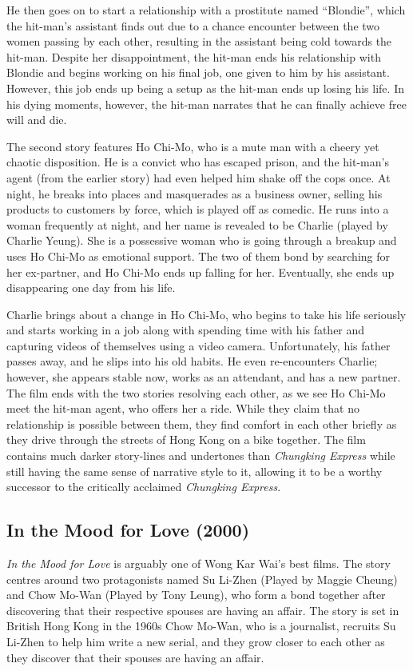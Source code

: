 \begin{multicols}{2}
He then goes on to start a relationship with a prostitute named “Blondie”, which the hit-man’s assistant finds out due to a chance encounter between the two women passing by each other, resulting in the assistant being cold towards the hit-man. Despite her disappointment, the hit-man ends his relationship with Blondie and begins working on his final job, one given to him by his assistant. However, this job ends up being a setup as the hit-man ends up losing his life. In his dying moments, however, the hit-man narrates that he can finally achieve free will and die.

The second story features Ho Chi-Mo, who is a mute man with a cheery yet chaotic disposition. He is a convict who has escaped prison, and the hit-man’s agent (from the earlier story) had even helped him shake off the cops once. At night, he breaks into places and masquerades as a business owner, selling his products to customers by force, which is played off as comedic. He runs into a woman frequently at night, and her name is revealed to be Charlie (played by Charlie Yeung). She is a possessive woman who is going through a breakup and uses Ho Chi-Mo as emotional support. The two of them bond by searching for her ex-partner, and Ho Chi-Mo ends up falling for her. Eventually, she ends up disappearing one day from his life. 

Charlie brings about a change in Ho Chi-Mo, who begins to take his life seriously and starts working in a job along with spending time with his father and capturing videos of themselves using a video camera. Unfortunately, his father passes away, and he slips into his old habits. He even re-encounters Charlie; however, she appears stable now, works as an attendant, and has a new partner. The film ends with the two stories resolving each other, as we see Ho Chi-Mo meet the hit-man agent, who offers her a ride. While they claim that no relationship is possible between them, they find comfort in each other briefly as they drive through the streets of Hong Kong on a bike together. The film contains much darker story-lines and undertones than \emph{Chungking Express} while still having the same sense of narrative style to it, allowing it to be a worthy successor to the critically acclaimed \emph{Chungking Express}.

\subsection{In the Mood for Love (2000)}
\emph{In the Mood for Love} is arguably one of Wong Kar Wai’s best films. The story centres around two protagonists named Su Li-Zhen (Played by Maggie Cheung) and Chow Mo-Wan (Played by Tony Leung), who form a bond together after discovering that their respective spouses are having an affair. The story is set in British Hong Kong in the 1960s Chow Mo-Wan, who is a journalist, recruits Su Li-Zhen to help him write a new serial, and they grow closer to each other as they discover that their spouses are having an affair.


\end{multicols}

